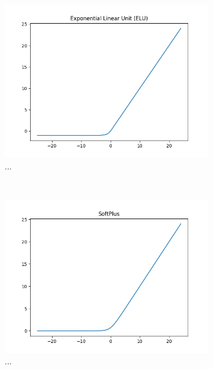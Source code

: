 \begin{figure}[t!]
	\centering
	\begin{subfigure}[t]{0.5\textwidth}
		\centering
		\includegraphics[width=\textwidth]{img/methodology_neuralNetwork_activationFunction_elu.png}
		\caption{...}
	\end{subfigure}%
	~ 
	\begin{subfigure}[t]{0.5\textwidth}
		\centering
		\includegraphics[width=\textwidth]{img/methodology_neuralNetwork_activationFunction_softplus.png}
		\caption{...}
	\end{subfigure}
	~
	\begin{subfigure}[t]{0.5\textwidth}
		\centering

\end{subfigure}
\end{figure}
